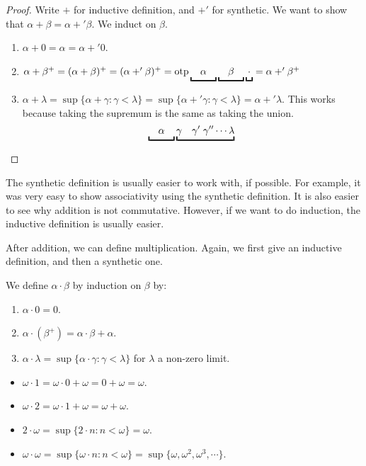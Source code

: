 \documentclass[a4paper]{article}
\begin{document}
\begin{proof}
  Write $+$ for inductive definition, and $+'$ for synthetic. We want to show that $\alpha + \beta = \alpha +' \beta$. We induct on $\beta$.

  \begin{enumerate}
    \item $\alpha + 0 = \alpha = \alpha +' 0$.
    \item $\alpha + \beta^+ = (\alpha + \beta)^+ = (\alpha +' \beta)^+ = \otp\underbracket{\quad\vphantom\beta\alpha\vphantom\beta\quad}\underbracket{\quad\beta\quad}\underbracket{\vphantom\beta\cdot\vphantom\beta} = \alpha +' \beta^+$
    \item $\alpha + \lambda = \sup\{\alpha + \gamma: \gamma < \lambda\} = \sup \{\alpha +' \gamma: \gamma < \lambda\} = \alpha +' \lambda$. This works because taking the supremum is the same as taking the union.
      \[
        \underbracket{\quad\vphantom\gamma\alpha\vphantom\gamma\quad}\underbracket{\gamma\quad\gamma'\;\gamma''\cdots \lambda}\qedhere
      \]%
  \end{enumerate}
\end{proof}
The synthetic definition is usually easier to work with, if possible. For example, it was very easy to show associativity using the synthetic definition. It is also easier to see why addition is not commutative. However, if we want to do induction, the inductive definition is usually easier.

After addition, we can define multiplication. Again, we first give an inductive definition, and then a synthetic one.
\begin{defi}
  We define $\alpha\cdot \beta$ by induction on $\beta$ by:
  \begin{enumerate}
    \item $\alpha\cdot 0 = 0$.
    \item $\alpha\cdot (\beta^+) = \alpha\cdot \beta + \alpha$.
    \item $\alpha\cdot \lambda = \sup\{\alpha\cdot \gamma: \gamma < \lambda\}$ for $\lambda$ a non-zero limit.
  \end{enumerate}
\end{defi}

\begin{eg}\leavevmode
  \begin{itemize}
    \item $\omega \cdot 1 = \omega\cdot 0 + \omega = 0 + \omega = \omega$.
    \item $\omega \cdot 2 = \omega \cdot 1 + \omega = \omega + \omega$.
    \item $2\cdot \omega = \sup\{2\cdot n: n < \omega\} = \omega$.
    \item $\omega\cdot \omega = \sup \{\omega\cdot n: n < \omega\} = \sup\{\omega, \omega^2, \omega^3, \cdots\}$.
  \end{itemize}
\end{eg}
\end{document}
